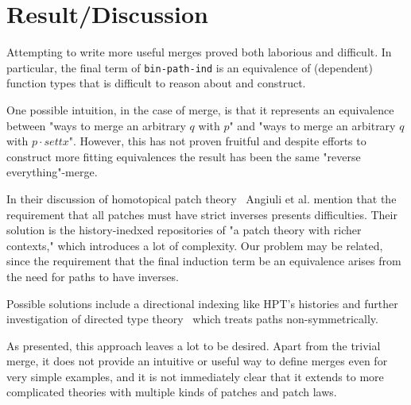 \section{Result/Discussion}
Attempting to write more useful merges proved both laborious and difficult. In
particular, the final term of \texttt{bin-path-ind} is an equivalence of
(dependent) function types that is difficult to reason about and construct.

One possible intuition, in the case of merge, is that it represents an equivalence between
"ways to merge an arbitrary $q$ with $p$" and "ways to merge an arbitrary $q$ with $p \cdot sett x$".
However, this has not proven fruitful and despite efforts to construct more fitting equivalences
the result has been the same "reverse everything"-merge.

In their discussion of homotopical patch theory~\cite{Angiuli2016} Angiuli et al. mention
that the requirement that all patches must have strict inverses presents difficulties.
Their solution is the history-inedxed repositories of "a patch theory with richer contexts,"
which introduces a lot of complexity. Our problem may be related, since the requirement that
the final induction term be an equivalence arises from the need for paths to have inverses.

Possible solutions include a directional indexing like HPT's histories and further investigation
of directed type theory~\cite{licata2011} which treats paths non-symmetrically.

As presented, this approach leaves a lot to be desired. Apart from the trivial
merge, it does not provide an intuitive or useful way to define merges even for
very simple examples, and it is not immediately clear that it
extends to more complicated theories with multiple kinds of patches and patch
laws.
